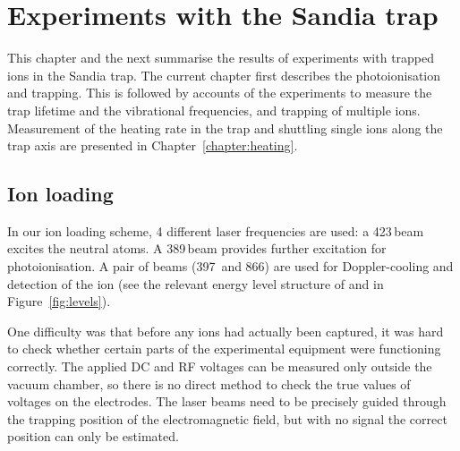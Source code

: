 \setcounter{chapter}{5} %
\chapter{Experiments with the Sandia trap}
\label{chapter:sandia}

This chapter and the next summarise the results of experiments with trapped  ions in the Sandia trap. The current chapter first describes the photoionisation and trapping. This is followed by accounts of the experiments to measure the trap lifetime and the vibrational frequencies, and trapping of multiple ions. Measurement of the heating rate in the trap and shuttling single ions along the trap axis are presented in Chapter~\ref{chapter:heating}.

\section{Ion loading}
\label{sec:ionload}
In our ion loading scheme, 4 different laser frequencies are used: a 423\nm\,beam excites the neutral \CaI{} atoms. A 389\nm\,beam provides further excitation for photoionisation. A pair of beams (397\nm\, and 866\nm) are used for Doppler-cooling and detection of the ion (see the relevant energy level structure of \CaI{} and \Ca{} in Figure~\ref{fig:levels}).

One difficulty was that before any ions had actually been captured, it was hard to check whether certain parts of the experimental equipment were functioning correctly. The applied DC and RF voltages can be measured only outside the vacuum chamber, so there is no direct method to check the true values of voltages on the electrodes. The laser beams need to be precisely guided through the trapping position of the electromagnetic field, but with no signal the correct position can only be estimated.


